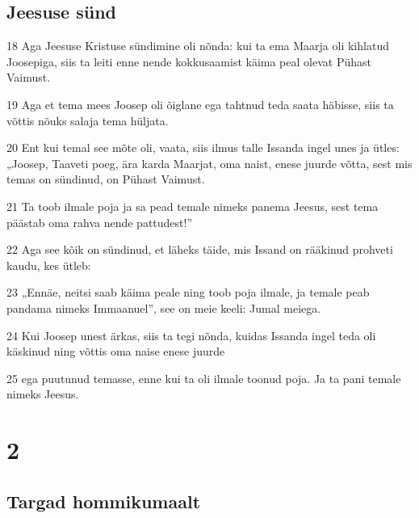 \section*{Jeesuse sünd}

\par 18 Aga Jeesuse Kristuse sündimine oli nõnda: kui ta ema Maarja oli kihlatud Joosepiga, siis ta leiti enne nende kokkusaamist käima peal olevat Pühast Vaimust.
\par 19 Aga et tema mees Joosep oli õiglane ega tahtnud teda saata häbisse, siis ta võttis nõuks salaja tema hüljata.
\par 20 Ent kui temal see mõte oli, vaata, siis ilmus talle Issanda ingel unes ja ütles: „Joosep, Taaveti poeg, ära karda Maarjat, oma naist, enese juurde võtta, sest mis temas on sündinud, on Pühast Vaimust.
\par 21 Ta toob ilmale poja ja sa pead temale nimeks panema Jeesus, sest tema päästab oma rahva nende pattudest!”
\par 22 Aga see kõik on sündinud, et läheks täide, mis Issand on rääkinud prohveti kaudu, kes ütleb:
\par 23 „Ennäe, neitsi saab käima peale ning toob poja ilmale, ja temale peab pandama nimeks Immaanuel”, see on meie keeli: Jumal meiega.
\par 24 Kui Joosep unest ärkas, siis ta tegi nõnda, kuidas Issanda ingel teda oli käskinud ning võttis oma naise enese juurde
\par 25 ega puutunud temasse, enne kui ta oli ilmale toonud poja. Ja ta pani temale nimeks Jeesus.

\chapter{2}

\section*{Targad hommikumaalt}

